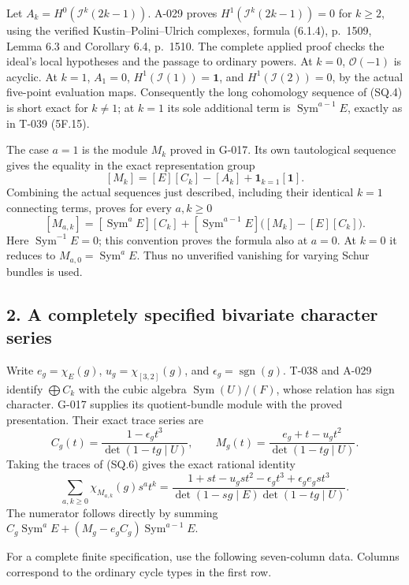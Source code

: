 \documentclass[
  10pt,
]{article}
\begin{document}
Let \(A_k=H^0(\mathcal I^k(2k-1))\). A-029 proves
\(H^1(\mathcal I^k(2k-1))=0\) for \(k\ge2\), using the verified
Kustin--Polini--Ulrich complexes, formula (6.1.4), p.~1509, Lemma 6.3
and Corollary 6.4, p.~1510. The complete applied proof checks the
ideal's local hypotheses and the passage to ordinary powers. At \(k=0\),
\(\mathcal O(-1)\) is acyclic. At \(k=1\), \(A_1=0\),
\(H^1(\mathcal I(1))=\mathbf1\), and \(H^1(\mathcal I(2))=0\), by the
actual five-point evaluation maps. Consequently the long cohomology
sequence of (SQ.4) is short exact for \(k\ne1\); at \(k=1\) its sole
additional term is \(\operatorname{Sym}^{a-1}E\), exactly as in T-039
(5F.15).

The case \(a=1\) is the module \(M_k\) proved in G-017. Its own
tautological sequence gives the equality in the exact representation
group \[
[M_k]=[E][C_k]-[A_k]+\mathbf1_{k=1}[\mathbf1].
\tag{SQ.5}
\] Combining the actual sequences just described, including their
identical \(k=1\) connecting terms, proves for every \(a,k\ge0\) \[
\boxed{[M_{a,k}]
=[\operatorname{Sym}^aE][C_k]
+[\operatorname{Sym}^{a-1}E]\bigl([M_k]-[E][C_k]\bigr).}
\tag{SQ.6}
\] Here \(\operatorname{Sym}^{-1}E=0\); this convention proves the
formula also at \(a=0\). At \(k=0\) it reduces to
\(M_{a,0}=\operatorname{Sym}^aE\). Thus no unverified vanishing for
varying Schur bundles is used.

\subsection{2. A completely specified bivariate character
series}\label{a-completely-specified-bivariate-character-series}

Write \(e_g=\chi_E(g)\), \(u_g=\chi_{[3,2]}(g)\), and
\(\epsilon_g=\operatorname{sgn}(g)\). T-038 and A-029 identify
\(\bigoplus C_k\) with the cubic algebra \(\operatorname{Sym}(U)/(F)\),
whose relation has sign character. G-017 supplies its quotient-bundle
module with the proved presentation. Their exact trace series are \[
C_g(t)=\frac{1-\epsilon_gt^3}{\det(1-tg\mid U)},\qquad
M_g(t)=\frac{e_g+t-u_gt^2}{\det(1-tg\mid U)}.
\tag{SQ.7}
\] Taking the traces of (SQ.6) gives the exact rational identity \[
\boxed{\sum_{a,k\ge0}\chi_{M_{a,k}}(g)s^at^k
=\frac{1+st-u_gst^2-\epsilon_gt^3+
               \epsilon_ge_gst^3}
 {\det(1-sg\mid E)\det(1-tg\mid U)}.}
\tag{SQ.8}
\] The numerator follows directly by summing
\(C_g\operatorname{Sym}^aE+(M_g-e_gC_g)\operatorname{Sym}^{a-1}E\).

For a complete finite specification, use the following seven-column
data. Columns correspond to the ordinary cycle types in the first row.
\end{document}
